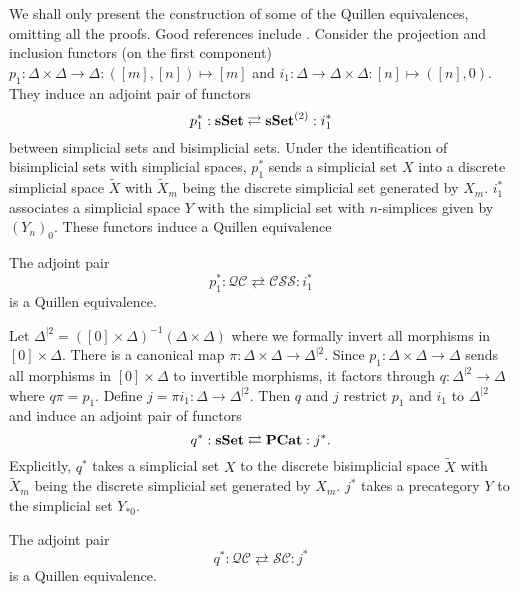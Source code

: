 \begin{refsection}
We shall only present the construction of some of the Quillen equivalences, omitting all the proofs. Good references include \cite{barwick-schommer-pries-unicity-homotopy-theory,bergner-characterization-of-fibrant-segal-categories,joyal-quasicategories-vs-simplicial-categories,joyal-tierney-quasi-categories-vs-segal-spaces}.
Consider the projection and inclusion functors (on the first component) $p_1:\Delta\times\Delta\to\Delta:([m],[n])\mapsto[m]$ and $i_1:\Delta\to\Delta\times\Delta:[n]\mapsto([n],0)$. They induce an adjoint pair of functors
$$p_1^*:\mathbf{sSet}\rightleftarrows\mathbf{sSet}^{(2)}:i_1^*$$
between simplicial sets and bisimplicial sets. Under the identification of bisimplicial sets with simplicial spaces, $p_1^*$ sends a simplicial set $X$ into a discrete simplicial space $\tilde X$ with $\tilde X_m$ being the discrete simplicial set generated by $X_m$. $i_1^*$ associates a simplicial space $Y$ with the simplicial set with $n$-simplices given by $(Y_n)_0$. These functors induce a Quillen equivalence
\begin{thm}\cite[Sec.~4]{joyal-tierney-quasi-categories-vs-segal-spaces}
The adjoint pair
$$p_1^*:\mathcal{QC}\rightleftarrows\mathcal{CSS}:i_1^*$$
is a Quillen equivalence.
\end{thm}

Let $\Delta^{|2}=([0]\times\Delta)^{-1}(\Delta\times\Delta)$ where we formally invert all morphisms in $[0]\times\Delta$. There is a canonical map $\pi:\Delta\times\Delta\to\Delta^{|2}$. Since $p_1:\Delta\times\Delta\to\Delta$ sends all morphisms in $[0]\times\Delta$ to invertible morphisms, it factors through $q:\Delta^{|2}\to\Delta$ where $q\pi=p_1$. Define $j=\pi i_1:\Delta\to\Delta^{|2}$. Then $q$ and $j$ restrict $p_1$ and $i_1$ to $\Delta^{|2}$ and induce an adjoint pair of functors
$$q^*:\mathbf{sSet}\rightleftarrows\mathbf{PCat}:j^*.$$
Explicitly, $q^*$ takes a simplicial set $X$ to the discrete bisimplicial space $\tilde X$ with $\tilde X_m$ being the discrete simplicial set generated by $X_m$. $j^*$ takes a precategory $Y$ to the simplicial set $Y_{*0}$.

\begin{thm}\cite[Sec.~5]{joyal-tierney-quasi-categories-vs-segal-spaces}
The adjoint pair
$$q^*:\mathcal{QC}\rightleftarrows\mathcal{SC}:j^*$$
is a Quillen equivalence.
\end{thm}


\end{refsection}
